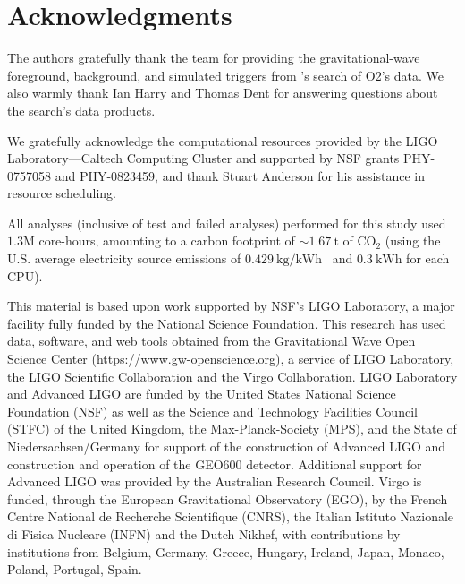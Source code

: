 \documentclass[useAMS,fleqn, usenatbib, final]{mnras}
\begin{document}
\section*{Acknowledgments}{
The authors gratefully thank the \pycbc team for providing the gravitational-wave foreground, background, and simulated triggers from \pycbc's search of O2's data. We also warmly thank Ian Harry and Thomas Dent for answering questions about the \pycbc search's data products.  

We gratefully acknowledge the computational resources provided by the LIGO Laboratory—Caltech Computing Cluster and supported by NSF grants PHY-0757058 and PHY-0823459, and thank Stuart Anderson for his assistance in resource scheduling.

All analyses (inclusive of test and failed analyses) performed for this study used ${1.3\mathrm{M}}$ core-hours, amounting to a carbon footprint of ${\sim1.67\ \mathrm{t}}$ of ${\text{CO}_2}$ (using the U.S. average electricity source emissions of ${0.429\ \text{kg/kWh}}$~\citep{greenhouse} and ${0.3\ \text{kWh}}$ for each CPU).

This material is based upon work supported by NSF’s LIGO Laboratory, a major facility fully funded by the National Science Foundation. This research has used data, software, and web tools obtained from the Gravitational Wave Open Science Center (\href{https://www.gw-openscience.org}{https://www.gw-openscience.org}), a service of LIGO Laboratory, the LIGO Scientific Collaboration and the Virgo Collaboration. LIGO Laboratory and Advanced LIGO are funded by the United States National Science Foundation (NSF) as well as the Science and Technology Facilities Council (STFC) of the United Kingdom, the Max-Planck-Society (MPS), and the State of Niedersachsen/Germany for support of the construction of Advanced LIGO and construction and operation of the GEO600 detector. Additional support for Advanced LIGO was provided by the Australian Research Council. Virgo is funded, through the European Gravitational Observatory (EGO), by the French Centre National de Recherche Scientifique (CNRS), the Italian Istituto Nazionale di Fisica Nucleare (INFN) and the Dutch Nikhef, with contributions by institutions from Belgium, Germany, Greece, Hungary, Ireland, Japan, Monaco, Poland, Portugal, Spain.


}
\end{document}
